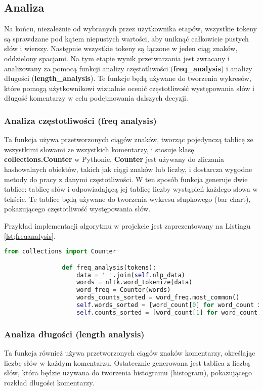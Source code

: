	
	\subsection{Analiza}
		Na końcu, niezależnie od wybranych przez użytkownika etapów, wszystkie tokeny są sprawdzane pod kątem niepustych wartości, aby uniknąć całkowicie pustych słów i wierszy. Następnie wszystkie tokeny są łączone w jeden ciąg znaków, oddzielony spacjami. Na tym etapie wynik przetwarzania jest zwracany i analizowany za pomocą funkcji analizy częstotliwości (\textbf{freq\_analysis}) i analizy długości (\textbf{length\_analysis}). Te funkcje będą używane do tworzenia wykresów, które pomogą użytkownikowi wizualnie ocenić częstotliwość występowania słów i długość komentarzy w celu podejmowania dalszych decyzji.
	
		\subsubsection{Analiza częstotliwości (freq analysis)}
			Ta funkcja używa przetworzonych ciągów znaków, tworząc pojedynczą tablicę ze wszystkimi słowami ze wszystkich komentarzy, i stosuje klasę \textbf{collections.Counter} w Pythonie. \textbf{Counter} jest używany do zliczania hashowalnych obiektów, takich jak ciągi znaków lub liczby, i dostarcza wygodne metody do pracy z danymi częstotliwości. W ten sposób funkcja generuje dwie tablice: tablicę słów i odpowiadającą jej tablicę liczby wystąpień każdego słowa w tekście. Te tablice będą używane do tworzenia wykresu słupkowego (bar chart), pokazującego częstotliwość występowania słów.
			
			Przykład implementacji algorytmu w projekcie jest zaprezentowany na Listingu \ref{lst;freqanalysis}.
			\begin{lstlisting}[language=Python, caption={Funkcja przeprowadzająca analizę częstotliwości tokenów}, label={lst:freqanalysis}]
				from collections import Counter

				def freq_analysis(tokens):
					data = ' '.join(self.nlp_data)
					words = nltk.word_tokenize(data)
					word_freq = Counter(words)
					words_counts_sorted = word_freq.most_common()
					self.words_sorted = [word_count[0] for word_count in words_counts_sorted]
					self.counts_sorted = [word_count[1] for word_count in words_counts_sorted]
			\end{lstlisting}
		
		\subsubsection{Analiza długości (length analysis)}
			Ta funkcja również używa przetworzonych ciągów znaków komentarzy, określając liczbę słów w każdym komentarzu. Ostatecznie generowana jest tablica z liczbą słów, która będzie używana do tworzenia histogramu (histogram), pokazującego rozkład długości komentarzy.
			
